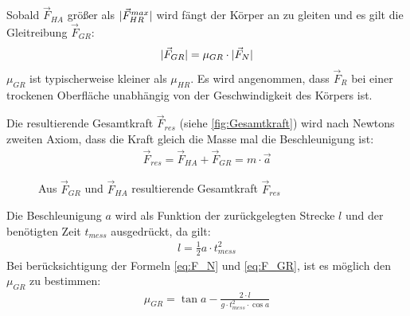 Sobald $\vec{F}_{HA}$ größer als $\lvert\vec{F}_{HR}^{max}\rvert$ wird fängt der Körper an zu gleiten und es gilt die Gleitreibung $\vec{F}_{GR}$:
\begin{align}
    \lvert\vec{F}_{GR}\rvert = \mu_{GR} \cdot \lvert\vec{F}_{N}\rvert
    \label{eq:F_GR}
\end{align}
$\mu_{GR}$ ist typischerweise kleiner als $\mu_{HR}$. Es wird angenommen, dass $\vec{F}_{R}$ bei einer trockenen Oberfläche unabhängig von der Geschwindigkeit des Körpers ist.\smallskip

Die resultierende Gesamtkraft $\vec{F}_{res}$ (siehe \autoref{fig:Gesamtkraft}) wird nach Newtons zweiten Axiom, dass die Kraft gleich die Masse mal die Beschleunigung ist:
\begin{align}
    \vec{F}_{res} = \vec{F}_{HA} + \vec{F}_{GR} = m \cdot \vec{a}
\end{align}

\begin{figure}[ht]
    \centering
    
    \caption[Resultierende Gesamtkraft]{Aus $\vec{F}_{GR}$ und $\vec{F}_{HA}$ resultierende Gesamtkraft $\vec{F}_{res}$}
    \label{fig:Gesamtkraft}
\end{figure}

Die Beschleunigung $a$ wird als Funktion der zurückgelegten Strecke $l$ und der benötigten Zeit $t_{mess}$ ausgedrückt, da gilt:
\begin{align}
    l = \frac{1}{2} a \cdot t_{mess}^2
\end{align}
Bei berücksichtigung der Formeln \autoref{eq:F_N} und \autoref{eq:F_GR}, ist es möglich den $\mu_{GR}$ zu bestimmen:
\begin{align}
    \mu_{GR} = \tan{a} - \frac{2\cdot l}{g \cdot t_{mess}^2 \cdot \cos{a}}
\end{align}